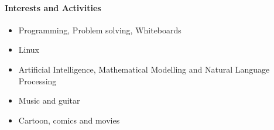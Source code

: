 \documentclass[letterpaper,10pt,oneside]{article}
\begin{document}
\paragraph{\large{Interests and Activities}}
\begin{itemize}
    \itemsep-0.2em 
    \item Programming, Problem solving, Whiteboards
    \item Linux
    \item Artificial Intelligence, Mathematical Modelling and Natural Language Processing
    \item Music and guitar
    \item Cartoon, comics and movies
\end{itemize}
\end{document}
